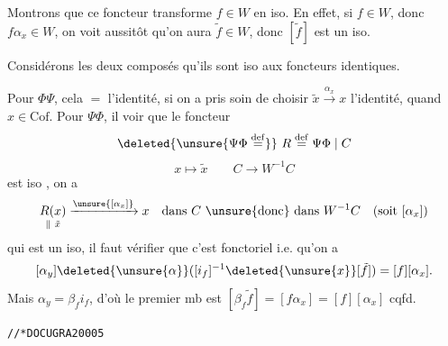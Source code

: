 
 Montrons que ce foncteur transforme $f\in W$ en iso.
En effet, si $f\in W$, donc $f\alpha_x\in W$, on voit aussitôt qu'on aura $\tilde f\in W$, donc $[\tilde f]$ est un iso.

Considérons les deux composés
  qu'ils  sont  iso aux foncteurs identiques.

Pour $\Phi\Psi$, cela $=$ l'identité, si on a pris soin de choisir $\tilde x\xrightarrow{\alpha_x}x$ l'identité, quand $x\in\mathrm{Cof}$.
Pour $\Psi\Phi$, il   voir que le foncteur
\[
\deleted{\unsure{\Psi\Phi\overset{\mathrm{def}}{=}}}\ R\overset{\mathrm{def}}{=}\Psi\Phi\mid C
\]
\[
x\longmapsto\tilde x\qquad C\longrightarrow W^{-1}C
\]
est iso  , on a
\[
\underset{\parallel\ \tilde x}{R(x)}\xrightarrow{\unsure{[\alpha_x]}}x\quad\text{dans }C\ \unsure{\text{donc}}\ \text{dans }W^{-1}C\quad(\text{soit }[\alpha_x])
\]
qui est un iso, il faut vérifier que c'est fonctoriel
i.e. qu'on a
\[
[\alpha_y]\deleted{\unsure{\alpha}}([i_f]^{-1}\deleted{\unsure{x}}[\tilde f])=[f][\alpha_x].
\]
Mais $\alpha_y=\beta_f i_f$, d'où le premier mb est $[\beta_f\tilde f]=[f\alpha_x]=[f][\alpha_x]$ cqfd.

\texttt{//*\quad DOCUGRA20005}\qquad{}

